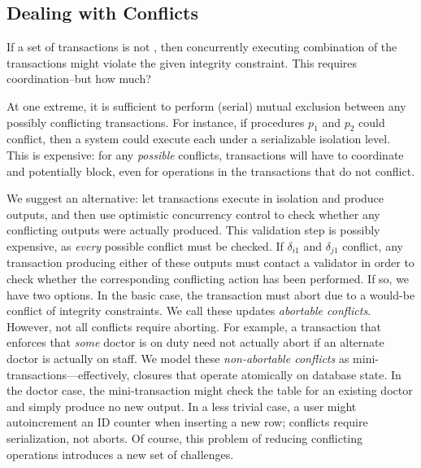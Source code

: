 \subsection{Dealing with Conflicts}
\label{sec:conflicts}

If a set of transactions is not \iconfluent, then concurrently
executing combination of the transactions might violate the given
integrity constraint. This requires coordination--but how much?

At one extreme, it is sufficient to perform (serial) mutual exclusion
between any possibly conflicting transactions. For instance, if
procedures $p_1$ and $p_2$ could conflict, then a system could execute
each under a serializable isolation level. This is expensive: for any
\textit{possible} conflicts, transactions will have to coordinate and
potentially block, even for operations in the transactions that do not
conflict.

We suggest an alternative: let transactions execute in isolation and
produce outputs, and then use optimistic concurrency control to check
whether any conflicting outputs were actually produced. This
validation step is possibly expensive, as \textit{every} possible
conflict must be checked. If $\delta_{i1}$ and $\delta_{j1}$ conflict,
any transaction producing either of these outputs must contact a
validator in order to check whether the corresponding conflicting
action has been performed. If so, we have two options. In the basic
case, the transaction must abort due to a would-be conflict of
integrity constraints. We call these updates \textit{abortable
  conflicts}. However, not all conflicts require aborting. For
example, a transaction that enforces that \textit{some} doctor is on
duty need not actually abort if an alternate doctor is actually on
staff. We model these \textit{non-abortable conflicts} as
mini-transactions---effectively, closures that operate atomically on
database state. In the doctor case, the mini-transaction might check
the table for an existing doctor and simply produce no new output. In
a less trivial case, a user might autoincrement an ID counter when
inserting a new row; conflicts require serialization, not aborts. Of
course, this problem of reducing conflicting operations introduces a
new set of challenges.

